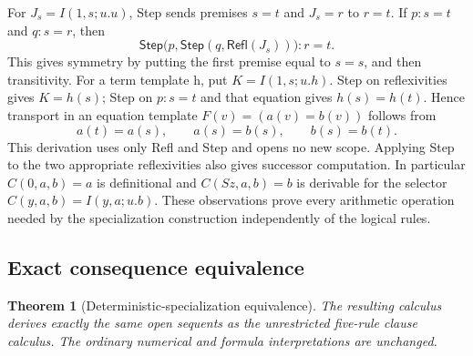 \documentclass[11pt,letterpaper]{article}
\newtheorem{theorem}{Theorem}[section]
\theoremstyle{definition}
\begin{document}
For \(J_s=I(1,s;u.u)\), Step sends premises \(s=t\) and \(J_s=r\)
to \(r=t\).  If \(p:s=t\) and \(q:s=r\), then
\[
 \mathsf{Step}\bigl(p,\mathsf{Step}(q,\mathsf{Refl}(J_s))\bigr)
       :r=t.
 \tag{Pivot}
\]
This gives symmetry by putting the first premise equal to \(s=s\), and
then transitivity.  For a term template h, put \(K=I(1,s;u.h)\).
Step on reflexivities gives \(K=h(s)\); Step on \(p:s=t\) and that
equation gives \(h(s)=h(t)\).  Hence transport in an equation template
\(F(v)=(a(v)=b(v))\) follows from
\[
 a(t)=a(s),\qquad a(s)=b(s),\qquad b(s)=b(t).
\]
This derivation uses only Refl and Step and opens no new scope.
Applying Step to the two appropriate reflexivities also gives successor
computation.  In particular \(C(0,a,b)=a\) is definitional and
\(C(Sz,a,b)=b\) is derivable for the selector
\(C(y,a,b)=I(y,a;u.b)\).  These observations prove every arithmetic
operation needed by the specialization construction independently of
the logical rules.

\subsection{Exact consequence equivalence}

\begin{theorem}[Deterministic-specialization equivalence]
The resulting calculus derives exactly the same open sequents as the
unrestricted five-rule clause calculus.  The ordinary numerical and
formula interpretations are unchanged.
\end{theorem}
\end{document}
